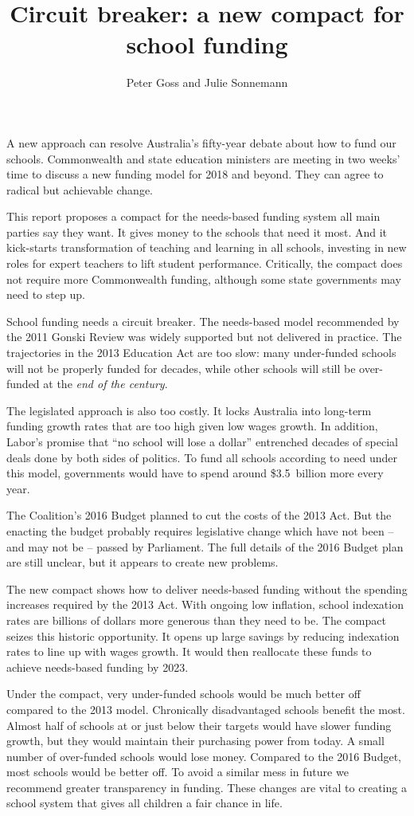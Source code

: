 \documentclass{grattan}
\title{Circuit breaker: a new compact for school funding}
\author{Peter Goss and Julie Sonnemann}
\begin{document}
\begin{overview}

A new approach can resolve Australia's fifty-year debate about how to fund our schools.
Commonwealth and state education ministers are meeting in two weeks' time to discuss a new funding model for 2018 and beyond.
They can agree to radical but achievable change.

This report proposes a compact for the needs-based funding system all main parties say they want.
It gives money to the schools that need it most.
And it kick-starts transformation of teaching and learning in all schools, investing in new roles for expert teachers to lift student performance. Critically, the compact does not require more Commonwealth funding, although some state governments may need to step up.

School funding needs a circuit breaker.
The needs-based model recommended by the 2011 Gonski Review was widely supported but not delivered in practice.
The trajectories in the 2013 Education Act are too slow: many under-funded schools will not be properly funded for decades, while other schools will still be over-funded at the \emph{end of the century}.

The legislated approach is also too costly.
It locks Australia into long-term funding growth rates that are too high given low wages growth.
In addition, Labor's promise that ``no school will lose a dollar'' entrenched decades of special deals done by both sides of politics.
To fund all schools according to need under this model, governments would have to spend around \$3.5~billion more every year.

The Coalition's 2016 Budget planned to cut the costs of the 2013 Act.
But the enacting the budget probably requires legislative change which have not been -- and may not be -- passed by Parliament.
The full details of the 2016 Budget plan are still unclear, but it appears
to create new problems.

The new compact shows how to deliver needs-based funding without the spending increases required by the 2013 Act.
With ongoing low inflation, school indexation rates are billions of dollars more generous than they need to be.
The compact seizes this historic opportunity.
It opens up large savings by reducing indexation rates to line up with wages growth.
It would then reallocate these funds to achieve needs-based funding by 2023.

Under the compact, very under-funded schools would be much better off compared to the 2013 model.
Chronically disadvantaged schools benefit the most.
Almost half of schools at or just below their targets would have slower funding growth, but they would maintain their purchasing power from today.
A small number of over-funded schools would lose money.
Compared to the 2016 Budget, most schools would be better off.
To avoid a similar mess in future we recommend greater transparency in funding.
These changes are vital to creating a school system that gives all children a fair chance in life.


\end{overview}
\end{document}
